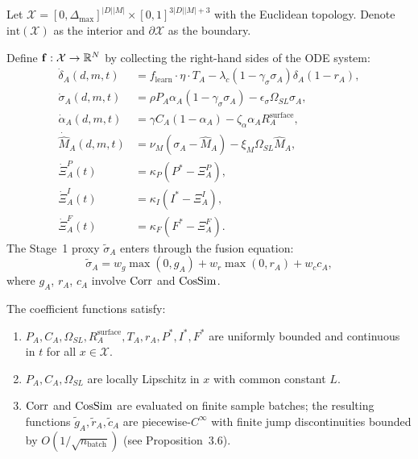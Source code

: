 
\begin{definition}
Let $\mathcal{X} = [0, \Delta_{\max}]^{|D||M|} \times [0,1]^{3|D||M| + 3}$
with the Euclidean topology. Denote $\text{int}(\mathcal{X})$ as the
interior and $\partial\mathcal{X}$ as the boundary.
\end{definition}

\begin{definition}
Define $\mathbf{f}: \mathcal{X} \to \mathbb{R}^N$ by collecting the right-hand
sides of the ODE system:
\begin{align*}
\dot{\delta}_A(d,m,t) &= f_{\text{learn}} \cdot \eta \cdot T_A
  - \lambda_c (1 - \gamma_\sigma \sigma_A) \delta_A (1 - r_A), \\
\dot{\sigma}_A(d,m,t) &=
  \rho P_A \alpha_A (1 - \gamma_\sigma \sigma_A) - \epsilon_\sigma \Omega_{SL} \sigma_A, \\
\dot{\alpha}_A(d,m,t) &=
  \gamma C_A (1 - \alpha_A) - \zeta_\alpha \alpha_A R_A^{\text{surface}}, \\
\dot{\hat{M}}_A(d,m,t) &=
  \nu_M (\sigma_A - \hat{M}_A) - \xi_M \Omega_{SL} \hat{M}_A, \\
\dot{\Xi}_A^P(t) &= \kappa_P (P^* - \Xi_A^P), \\
\dot{\Xi}_A^I(t) &= \kappa_I (I^* - \Xi_A^I), \\
\dot{\Xi}_A^F(t) &= \kappa_F (F^* - \Xi_A^F).
\end{align*}
The Stage~1 proxy $\tilde{\sigma}_A$ enters through the fusion equation:
\[
\tilde{\sigma}_A = w_g \max(0, g_A) + w_r \max(0, r_A) + w_c c_A,
\]
where $g_A$, $r_A$, $c_A$ involve $\operatorname{Corr}$ and $\operatorname{CosSim}$.
\end{definition}

\begin{assumption}
\label{assum:regularity}
The coefficient functions satisfy:
\begin{enumerate}[nosep]
\item $P_A, C_A, \Omega_{SL}, R_A^{\text{surface}}, T_A, r_A, P^*, I^*, F^*$
  are uniformly bounded and continuous in $t$ for all $x \in \mathcal{X}$.
\item $P_A, C_A, \Omega_{SL}$ are locally Lipschitz in $x$ with common
  constant $L$.
\item $\operatorname{Corr}$ and $\operatorname{CosSim}$ are evaluated on finite sample batches;
  the resulting functions $\tilde{g}_A, \tilde{r}_A, \tilde{c}_A$ are
  piecewise-$C^\infty$ with finite jump discontinuities bounded by
  $O(1/\sqrt{n_{\text{batch}}})$ (see Proposition~3.6).
\end{enumerate}
\end{assumption}

